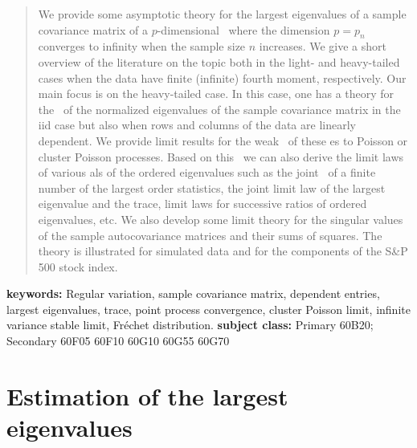 \begin{abstract}
We  provide some  asymptotic theory for the largest eigenvalues of a sample covariance matrix
of a $p$-dimensional \ts\ where the dimension $p=p_n$ converges to infinity when the sample size $n$ increases.
We give a short overview of the literature on the topic both in the light- and heavy-tailed cases when the data have
finite (infinite) fourth moment, respectively.
Our main focus is on the heavy-tailed case. In this case, one has a theory for the \pp\ of the normalized eigenvalues
of the sample covariance matrix in the iid case but also when rows and columns of the data are linearly dependent.
We provide limit results for the weak \con\ of these \pp es to Poisson or cluster Poisson processes. Based on
this \con\ we can also derive the limit laws of various \fct als of the ordered eigenvalues such as the
joint \con\ of a finite number of the largest order statistics, the joint limit law of the largest eigenvalue and the trace,
limit laws for successive ratios of ordered eigenvalues,
etc. We also develop some
limit theory for the singular values of the sample autocovariance matrices and their sums of squares. The theory is illustrated
for simulated data and for the components of the S\&P 500 stock index.
\end{abstract}
{\bf keywords: }{Regular variation, sample covariance matrix, dependent
  entries, largest  eigenvalues, trace, point process convergence,
  cluster Poisson limit, infinite variance stable limit, Fr\'echet
  distribution.}
{\bf subject class: }{Primary 60B20; Secondary 60F05 60F10 60G10 60G55 60G70}



\section{Estimation of the largest eigenvalues}
\label{sec:motivation}
